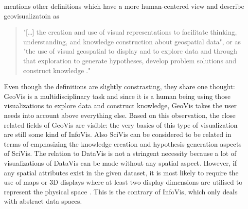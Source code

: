 \begin{enumerate}
\citeauthor{Noellenburg2007} mentions other definitions which have a more human-centered view and describe geovisualizatoin as
\begin{quote}
"[\ldots] the creation and use of visual representations to facilitate thinking, understanding, and knowledge construction about geospatial data", or as "the use of visual geospatial to display and to explore data and through that exploration to generate hypotheses, develop problem solutions and construct knowledge ."
\end{quote}

Even though the definitions are slightly constrasting, they share one thought: \ac{GeoVis} is a multidisciplinary task and since it is a human being using those visualizations to explore data and construct knowledge, \ac{GeoVis} takes the user needs into account above everything else.
Based on this observation, the close related fields of \ac{GeoVis} are visible: the very basics of this type of visualization are still some kind of \ac{InfoVis}. Also \ac{SciVis} can be considered to be related in terms of emphasizing the knowledge creation and hypothesis generation aspects of \ac{SciVis}. The relation to \ac{DataVis} is not a stringent necessity because a lot of visualizations of \ac{DataVis} can be made without any spatial aspect. However, if any spatial attributes exist in the given dataset, it is most likely to require the use of maps or 3D displays where at least two display dimensions are utilised to represent the physical space .
This is the contrary of \ac{InfoVis}, which only deals with abstract data spaces.
\end{enumerate}